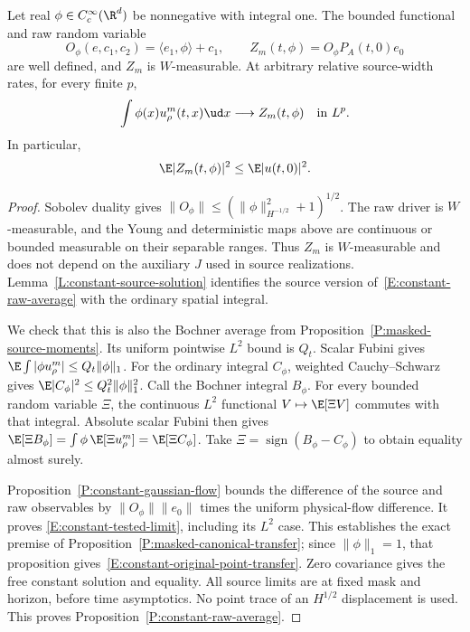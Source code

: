 \begin{proposition}
  \label{P:constant-raw-average}
  Let real $\phi\in C_c^\infty(\R^d)$ be nonnegative with integral one.
  The bounded functional and raw random variable
  \begin{equation}\label{E:constant-raw-average}
    O_\phi(e,c_1,c_2)=\langle e_1,\phi\rangle+c_1,\qquad
    Z_m(t,\phi)=O_\phi P_A(t,0)e_0
  \end{equation}
  are well defined, and $Z_m$ is $W$-measurable. At arbitrary
  relative source-width rates, for every finite $p$,
  \begin{equation}\label{E:constant-tested-limit}
    \int\phi(x)u_\rho^m(t,x)\ud x
    \longrightarrow Z_m(t,\phi)\quad\text{in }L^p.
  \end{equation}
  In particular,
  \begin{equation}\label{E:constant-original-point-transfer}
    \E|Z_m(t,\phi)|^2\le\E|u(t,0)|^2.
  \end{equation}
\end{proposition}

\begin{proof}
  Sobolev duality gives
  $\|O_\phi\|\le(\|\phi\|_{H^{-1/2}}^2+1)^{1/2}$.
  The raw driver is $W$-measurable, and the Young and deterministic maps
  above are continuous or bounded measurable on their separable ranges.
  Thus $Z_m$ is $W$-measurable and does not depend on the auxiliary
  $J$ used in source realizations.
  Lemma~\ref{L:constant-source-solution} identifies the source version
  of~\eqref{E:constant-raw-average} with the ordinary spatial integral.

  We check that this is also the Bochner average from
  Proposition~\ref{P:masked-source-moments}. Its uniform pointwise
  $L^2$ bound is $Q_t$. Scalar Fubini gives
  $\E\int|\phi u_\rho^m|\le Q_t\|\phi\|_1$.
  For the ordinary integral $C_\phi$, weighted Cauchy--Schwarz gives
  $\E|C_\phi|^2\le Q_t^2\|\phi\|_1^2$. Call the Bochner integral
  $B_\phi$. For every bounded random variable $\Xi$, the continuous
  $L^2$ functional $V\mapsto\E[\Xi V]$ commutes with that integral.
  Absolute scalar Fubini then gives
  $\E[\Xi B_\phi]=\int\phi\,\E[\Xi u_\rho^m]=\E[\Xi C_\phi]$.
  Take $\Xi=\operatorname{sign}(B_\phi-C_\phi)$ to obtain equality
  almost surely.

  Proposition~\ref{P:constant-gaussian-flow} bounds the difference of
  the source and raw observables by $\|O_\phi\|\|e_0\|$ times the
  uniform physical-flow difference. It proves
  \eqref{E:constant-tested-limit}, including its $L^2$ case.
  This establishes the exact premise of
  Proposition~\ref{P:masked-canonical-transfer}; since $\|\phi\|_1=1$,
  that proposition gives~\eqref{E:constant-original-point-transfer}.
  Zero covariance gives the free constant solution and equality.
  All source limits are at fixed mask and horizon, before time
  asymptotics. No point trace of an $H^{1/2}$ displacement is used.
  This proves Proposition~\ref{P:constant-raw-average}.
\end{proof}

